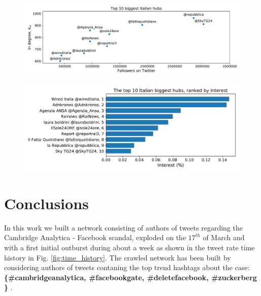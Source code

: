 \documentclass[11pt, twoside]{report}
\begin{document}
    \begin{figure}[htbp]
      \centering
      \includegraphics[width=\textwidth]{../../scripts/network_analysis/imgs/hubs_followers_ita.pdf}            
      \caption{}
      \label{fig:hubs_followers_ita}
    \end{figure}

    \begin{figure}[htbp]
      \centering
      \includegraphics[width=\textwidth]{../../scripts/network_analysis/imgs/hubs_interest_ita.pdf}            
      \caption{}
      \label{fig:hubs_followers_ita}
    \end{figure}

    


    

    

    


    \chapter{Conclusions}


    In this work we built a network consisting of authors of tweets regarding the Cambridge Analytica - Facebook scandal, exploded on the $17^{th}$ of March and with a first initial outburst during about a week as shown in the tweet rate time history in Fig. \ref{fig:time_history}.
    The crawled network has been built by considering authors of tweets contaning the top trend hashtags about the case:\\
    \textbf{  \{\#cambridgeanalytica, \#facebookgate, \#deletefacebook, \#zuckerberg \} }.
\end{document}
